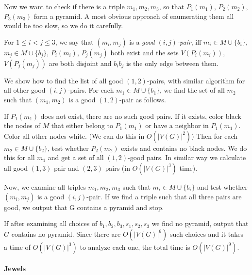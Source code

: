 \documentclass{article}
\newcommand{\TODO}{\todo[inline]}
\begin{document}
Now we want to check if there is a triple $m_1, m_2, m_3$, so that $P_1(m_1)$, $P_2(m_2)$, $P_3(m_3)$ form a pyramid. A most obvious approach of enumerating them all would be too slow, so we do it carefully.

For $1 \leq i < j \leq 3$, we say that $(m_i, m_j)$ is a \emph{good $(i, j)$-pair}, iff $m_i \in M \cup \{b_i\}$, $m_j \in M \cup \{b_j\}$, $P_i(m_i)$, $P_j(m_j)$ both exist and the sets $V(P_i(m_i))$,$V(P_j(m_j))$ are both disjoint and $b_ib_j$ is the only edge between them.

We show how to find the list of all good $(1, 2)$-pairs, with similar algorithm for all other good $(i, j)$-pairs. For each $m_1 \in M \cup \{b_1\}$, we find the set of all $m_2$ such that $(m_1, m_2)$ is a good $(1,2)$-pair as follows.

If $P_1(m_1)$ does not exist, there are no such good pairs. If it exists, color black the nodes of $M$ that either belong to $P_1(m_1)$ or have a neighbor in $P_1(m_1)$. Color all other nodes white. (We can do this in $O(|V(G)|^2)$) Then for each $m_2 \in M \cup \{b_2\}$, test whether $P_2(m_2)$ exists and contains no black nodes. We do this for all $m_1$ and get a set of all $(1,2)$-good pairs. In similar way we calculate all good $(1,3)$-pair and $(2,3)$-pairs (in $O(|V(G)|^3)$ time).

Now, we examine all triples $m_1, m_2, m_3$ such that $m_i \in M \cup \{b_i\}$ and test whether $(m_i, m_j)$ is a good $(i, j)$-pair. If we find a triple such that all three pairs are good, we output that G contains a pyramid and stop.

If after examining all choices of $b_1, b_2, b_3, s_1, s_2, s_3$ we find no pyramid, output that $G$ contains no pyramid. Since there are $O(|V(G)|^6)$ such choices and it takes a time of $O(|V(G)|^3)$ to analyze each one, the total time is $O(|V(G)|^9)$.

\TODO{some proofs}


\paragraph{Jewels}
\end{document}
